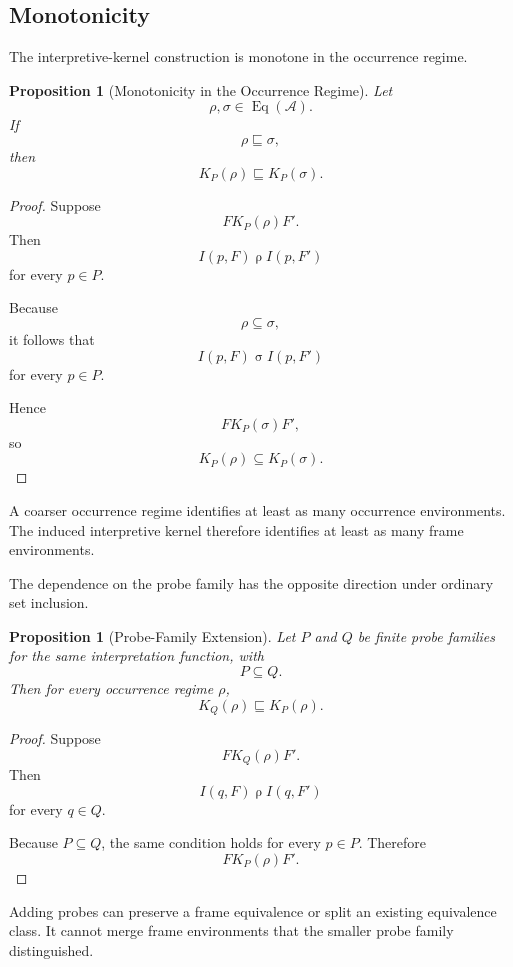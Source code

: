 \documentclass[11pt]{article}
\theoremstyle{plain}
\newtheorem{proposition}[theorem]{Proposition}
\theoremstyle{definition}
\theoremstyle{remark}
\begin{document}
\subsection{Monotonicity}

The interpretive-kernel construction is monotone
in the occurrence regime.

\begin{proposition}[Monotonicity in the Occurrence Regime]
  \label{ik.prop.kernel-monotone}
  Let
  \[
    \rho,\sigma
    \in
    \operatorname{Eq}(\mathcal{A}).
  \]
  If
  \[
    \rho\sqsubseteq\sigma,
  \]
  then
  \[
    K_P(\rho)
    \sqsubseteq
    K_P(\sigma).
  \]
\end{proposition}

\begin{proof}
  Suppose
  \[
    F\mathrel{K_P(\rho)}F'.
  \]
  Then
  \[
    I(p,F)\mathrel{\rho}I(p,F')
  \]
  for every \(p\in P\).

  Because
  \[
    \rho\subseteq\sigma,
  \]
  it follows that
  \[
    I(p,F)\mathrel{\sigma}I(p,F')
  \]
  for every \(p\in P\).

  Hence
  \[
    F\mathrel{K_P(\sigma)}F',
  \]
  so
  \[
    K_P(\rho)
    \subseteq
    K_P(\sigma).
  \]
\end{proof}

A coarser occurrence regime
identifies at least as many occurrence environments.
The induced interpretive kernel therefore identifies
at least as many frame environments.

The dependence on the probe family has the opposite direction
under ordinary set inclusion.

\begin{proposition}[Probe-Family Extension]
  \label{ik.prop.probe-extension}
  Let \(P\) and \(Q\) be finite probe families
  for the same interpretation function,
  with
  \[
    P\subseteq Q.
  \]
  Then for every occurrence regime \(\rho\),
  \[
    K_Q(\rho)
    \sqsubseteq
    K_P(\rho).
  \]
\end{proposition}

\begin{proof}
  Suppose
  \[
    F\mathrel{K_Q(\rho)}F'.
  \]
  Then
  \[
    I(q,F)\mathrel{\rho}I(q,F')
  \]
  for every \(q\in Q\).

  Because \(P\subseteq Q\),
  the same condition holds for every \(p\in P\).
  Therefore
  \[
    F\mathrel{K_P(\rho)}F'.
  \]
\end{proof}

Adding probes can preserve a frame equivalence
or split an existing equivalence class.
It cannot merge frame environments
that the smaller probe family distinguished.
\end{document}

